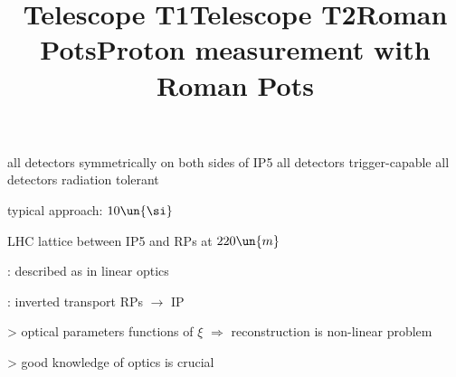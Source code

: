 \> all detectors symmetrically on both sides of IP5
\> all detectors trigger-capable
\> all detectors radiation tolerant

\vfil

\newpage %
\title{Telescope T1}



\newpage %
\title{Telescope T2}



\newpage %
\title{Roman Pots}

\> typical approach: $10\un{\si}$


\newpage %
\title{Proton measurement with Roman Pots}

\vskip-5mm

\> LHC lattice between IP5 and RPs at $220\un{m}$

\vskip1mm

\> : described as in linear optics


\vskip1mm	

\> : inverted transport RPs $\longrightarrow$ IP

\>> optical parameters functions of $\xi$ $\Rightarrow$ reconstruction is non-linear problem

\>> \cYe good knowledge of optics is crucial\cFg


